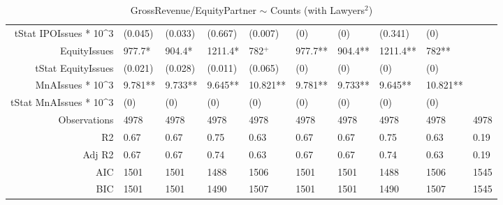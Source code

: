 \begin{table}[ht]
\begin{tabular}{rlllllllll}
  tStat IPOIssues * 10^3 & (0.045) & (0.033) & (0.667) & (0.007) & (0) & (0) & (0.341) & (0) &  \\ 
  EquityIssues & 977.7* & 904.4* & 1211.4* & 782$^{+}$ & 977.7** & 904.4** & 1211.4** & 782** &  \\ 
  tStat EquityIssues & (0.021) & (0.028) & (0.011) & (0.065) & (0) & (0) & (0) & (0) &  \\ 
  MnAIssues * 10^3 & 9.781** & 9.733** & 9.645** & 10.821** & 9.781** & 9.733** & 9.645** & 10.821** &  \\ 
  tStat MnAIssues * 10^3 & (0) & (0) & (0) & (0) & (0) & (0) & (0) & (0) &  \\ 
  Observations & 4978 & 4978 & 4978 & 4978 & 4978 & 4978 & 4978 & 4978 & 4978 \\ 
  R2 & 0.67 & 0.67 & 0.75 & 0.63 & 0.67 & 0.67 & 0.75 & 0.63 & 0.19 \\ 
  Adj R2 & 0.67 & 0.67 & 0.74 & 0.63 & 0.67 & 0.67 & 0.74 & 0.63 & 0.19 \\ 
  AIC & 1501 & 1501 & 1488 & 1506 & 1501 & 1501 & 1488 & 1506 & 1545 \\ 
  BIC & 1501 & 1501 & 1490 & 1507 & 1501 & 1501 & 1490 & 1507 & 1545 \\ 
   \hline
\end{tabular}
\caption{GrossRevenue/EquityPartner $\sim$ Counts (with Lawyers$^2$)} 
\end{table}
